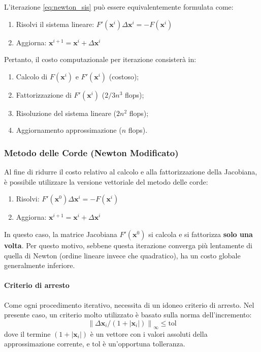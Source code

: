 \begin{osservazione}
L'iterazione \eqref{eq:newton_sis} può essere equivalentemente formulata come:
\begin{enumerate}
    \item Risolvi il sistema lineare: $F'(\mathbf{x}^i) \Delta \mathbf{x}^i = -F(\mathbf{x}^i)$
    \item Aggiorna: $\mathbf{x}^{i+1} = \mathbf{x}^i + \Delta \mathbf{x}^i$
\end{enumerate}
Pertanto, il costo computazionale per iterazione consisterà in:
\begin{enumerate}
    \item Calcolo di $F(\mathbf{x}^i)$ e $F'(\mathbf{x}^i)$ (costoso);
    \item Fattorizzazione di $F'(\mathbf{x}^i)$ ($2/3 n^3$ flops);
    \item Risoluzione del sistema lineare ($2n^2$ flops);
    \item Aggiornamento approssimazione ($n$ flops).
\end{enumerate}
\end{osservazione}

\subsubsection{Metodo delle Corde (Newton Modificato)}
Al fine di ridurre il costo relativo al calcolo e alla fattorizzazione della Jacobiana, è possibile utilizzare la versione vettoriale del metodo delle corde:
\begin{enumerate}
    \item Risolvi: $F'(\mathbf{x}^0) \Delta \mathbf{x}^i = -F(\mathbf{x}^i)$
    \item Aggiorna: $\mathbf{x}^{i+1} = \mathbf{x}^i + \Delta \mathbf{x}^i$
\end{enumerate}
In questo caso, la matrice Jacobiana $F'(\mathbf{x}^0)$ si calcola e si fattorizza \textbf{solo una volta}.
Per questo motivo, sebbene questa iterazione converga più lentamente di quella di Newton (ordine lineare invece che quadratico), ha un costo globale generalmente inferiore.

\paragraph{Criterio di arresto}
Come ogni procedimento iterativo, necessita di un idoneo criterio di arresto. Nel presente caso, un criterio molto utilizzato è basato sulla norma dell'incremento:
$$ \left\| \Delta \mathbf{x}_i / (1 + |\mathbf{x}_i|) \right\|_\infty \le \text{tol} $$
dove il termine $(1+|\mathbf{x}_i|)$ è un vettore con i valori assoluti della approssimazione corrente, e $\text{tol}$ è un'opportuna tolleranza.